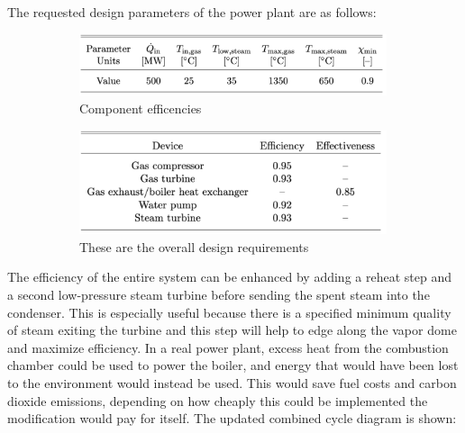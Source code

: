 \documentclass{article}
\begin{document}
\FloatBarrier

The requested design parameters of the power plant are as follows:

\begin{figure}[htbp]
  \centering
  \begin{subfigure}[t]{0.45\textwidth}
    \centering
  \includegraphics[page=1,trim=0mm 0mm 0mm 0mm,clip,width=0.99\textwidth]{Figures/png2pdf (1).pdf}
  \caption{Component efficencies}
  \label{fig:epsfig}
\end{subfigure}%
  \begin{subfigure}[t]{0.45\textwidth}
  \centering
  \includegraphics[page=1,trim=0mm 0mm 0mm 0mm,clip,width=0.99\textwidth]{Figures/png2pdf.pdf}
  \caption{These are the overall design requirements}
  \label{fig:pdffig}
  \end{subfigure}%
  \caption{}
  \label{fig:testfig}
\end{figure}

\FloatBarrier

The efficiency of the entire system can be enhanced by adding a reheat step and a second low-pressure steam turbine before sending the spent steam into the condenser. This is especially useful because there is a specified minimum quality of steam exiting the turbine and this step will help to edge along the vapor dome and maximize efficiency. In a real power plant, excess heat from the combustion chamber could be used to power the boiler, and energy that would have been lost to the environment would instead be used. This would save fuel costs and carbon dioxide emissions, depending on how cheaply this could be implemented the modification would pay for itself. The updated combined cycle diagram is shown:
\end{document}
